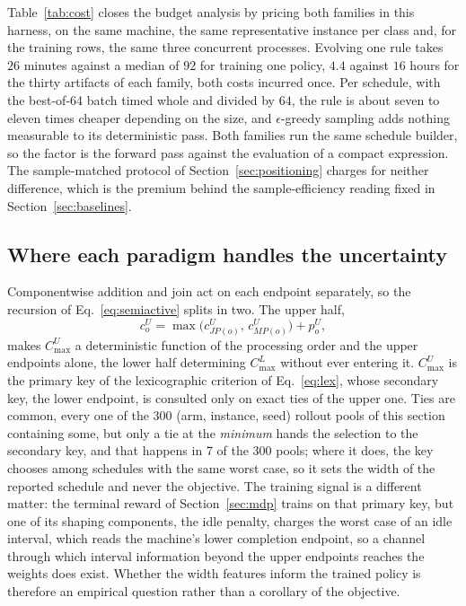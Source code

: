 \documentclass[preprint,12pt]{elsarticle}
\theoremstyle{definition}
\theoremstyle{remark}
\begin{document}
Table~\ref{tab:cost} closes the budget analysis by pricing both
families in this harness, on the same machine, the same
representative instance per class and, for the training rows, the
same three concurrent processes. Evolving one rule takes $26$ minutes
against a median of $92$ for training one policy, $4.4$ against $16$
hours for the thirty artifacts of each family, both costs incurred
once. Per schedule, with the best-of-64 batch timed whole and
divided by $64$, the rule is about seven to eleven times cheaper
depending on the size, and $\epsilon$-greedy sampling adds nothing
measurable to its deterministic pass. Both families run the same
schedule builder, so the factor is the forward pass against the
evaluation of a compact expression. The sample-matched protocol of
Section~\ref{sec:positioning} charges for neither difference, which
is the premium behind the sample-efficiency reading fixed in
Section~\ref{sec:baselines}.

\subsection{Where each paradigm handles the uncertainty}
\label{sec:ablations-interval}

Componentwise addition and join act on each endpoint separately, so
the recursion of Eq.~\eqref{eq:semiactive} splits in two. The upper
half,
\begin{equation}
c^{U}_{o}=\max\!\big(c^{U}_{JP(o)},\,c^{U}_{MP(o)}\big)+p^{U}_{o},
\label{eq:upperclosed}
\end{equation}
makes $C^U_{\max}$ a deterministic function of the processing order
and the upper endpoints alone, the lower half determining
$C^L_{\max}$ without ever entering it. $C^U_{\max}$ is the primary
key of the lexicographic criterion of Eq.~\eqref{eq:lex}, whose
secondary key, the lower endpoint, is consulted only on exact ties of
the upper one. Ties are common, every one of the 300 (arm, instance,
seed) rollout pools of this section containing some, but only a tie
at the \emph{minimum} hands the selection to the secondary key, and
that happens in 7 of the 300 pools; where it does, the key chooses
among schedules with the same worst case, so it sets the width of the
reported schedule and never the objective. The training signal is a
different matter: the terminal reward of Section~\ref{sec:mdp} trains
on that primary key, but one of its shaping components, the idle
penalty, charges the worst case of an idle interval, which reads the
machine's lower completion endpoint, so a channel through which
interval information beyond the upper endpoints reaches the weights
does exist. Whether the width features inform the trained policy is
therefore an empirical question rather than a corollary of the
objective.
\end{document}
